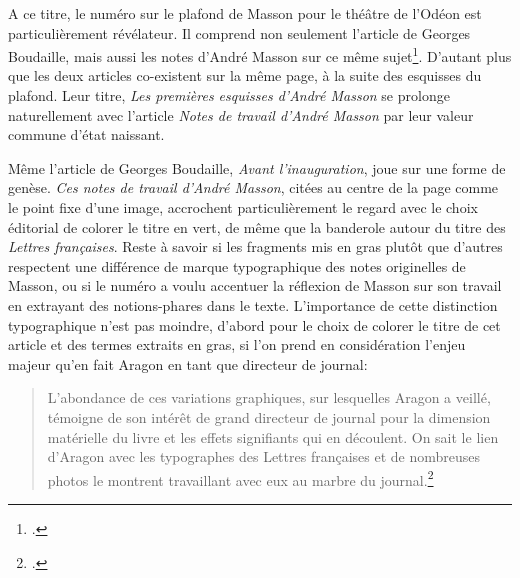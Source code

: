 {	A ce titre, le numéro sur le plafond de Masson pour le théâtre de l’Odéon est particulièrement révélateur. Il comprend non seulement l’article de Georges Boudaille, mais aussi les notes d’André Masson sur ce même sujet\footcite{}. D’autant plus que les deux articles co-existent sur la même page, à la suite des esquisses du plafond. Leur titre, \emph{Les premières esquisses d’André Masson} se prolonge naturellement avec l’article \emph{Notes de travail d’André Masson} par leur valeur commune d’état naissant. 


Même l’article de Georges Boudaille, \emph{Avant l’inauguration}, joue sur une forme de genèse. \emph{Ces notes de travail d’André Masson}, citées au centre de la page comme le point fixe d’une image, accrochent particulièrement le regard avec le choix éditorial de colorer le titre en vert, de même que la banderole autour du titre des \emph{Lettres françaises}. Reste à savoir si les fragments mis en gras plutôt que d’autres respectent une différence de marque typographique des notes originelles de Masson, ou si le numéro a voulu accentuer la réflexion de Masson sur son travail en extrayant des notions-phares dans le texte. L’importance de cette distinction typographique n’est pas moindre, d’abord pour le choix de colorer le titre de cet article et des termes extraits en gras, si l’on prend en considération l’enjeu majeur qu’en fait Aragon en tant que directeur de journal: 

\begin{quote}
L’abondance de ces variations graphiques, sur lesquelles Aragon a veillé, témoigne de son intérêt de grand directeur de journal pour la dimension matérielle du livre et les effets signifiants qui en découlent. On sait le lien d’Aragon avec les typographes des Lettres françaises et de nombreuses photos le montrent travaillant avec eux au marbre du journal.\footcite[p333]{vasseviere}	
\end{quote}

}
